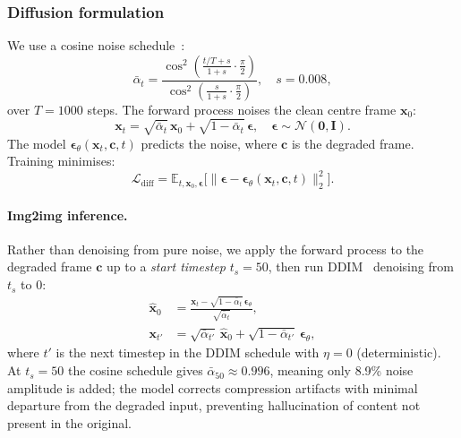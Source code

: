 \documentclass[10pt, conference]{IEEEtran}
\begin{document}
\subsubsection{Diffusion formulation}

We use a cosine noise schedule~\cite{Nichol_2021_IDDPM}:
\begin{equation}
\bar{\alpha}_t = \frac{\cos^2\!\left(\frac{t/T + s}{1+s} \cdot \frac{\pi}{2}\right)}{\cos^2\!\left(\frac{s}{1+s} \cdot \frac{\pi}{2}\right)}, \quad s = 0.008,
\end{equation}
over $T{=}1000$ steps. The forward process noises the clean centre frame $\mathbf{x}_0$:
\begin{equation}
\mathbf{x}_t = \sqrt{\bar{\alpha}_t}\,\mathbf{x}_0 + \sqrt{1{-}\bar{\alpha}_t}\,\boldsymbol{\epsilon}, \quad \boldsymbol{\epsilon} \sim \mathcal{N}(\mathbf{0}, \mathbf{I}).
\end{equation}
The model $\boldsymbol{\epsilon}_\theta(\mathbf{x}_t, \mathbf{c}, t)$ predicts the noise, where $\mathbf{c}$ is the degraded frame. Training minimises:
\begin{equation}
\mathcal{L}_{\text{diff}} = \mathbb{E}_{t,\mathbf{x}_0,\boldsymbol{\epsilon}}\bigl[\|\boldsymbol{\epsilon} - \boldsymbol{\epsilon}_\theta(\mathbf{x}_t, \mathbf{c}, t)\|_2^2\bigr].
\label{eq:diff_loss}
\end{equation}

\paragraph{Img2img inference.}
Rather than denoising from pure noise, we apply the forward process to the degraded frame $\mathbf{c}$ up to a \emph{start timestep} $t_s{=}50$, then run DDIM~\cite{Song_2021_DDIM} denoising from $t_s$ to $0$:
\begin{align}
\hat{\mathbf{x}}_0 &= \frac{\mathbf{x}_t - \sqrt{1{-}\bar{\alpha}_t}\,\boldsymbol{\epsilon}_\theta}{\sqrt{\bar{\alpha}_t}}, \label{eq:x0_pred}\\
\mathbf{x}_{t'} &= \sqrt{\bar{\alpha}_{t'}}\,\hat{\mathbf{x}}_0 + \sqrt{1{-}\bar{\alpha}_{t'}}\,\boldsymbol{\epsilon}_\theta, \label{eq:ddim_step}
\end{align}
where $t'$ is the next timestep in the DDIM schedule with $\eta{=}0$ (deterministic). At $t_s{=}50$ the cosine schedule gives $\bar{\alpha}_{50}\approx0.996$, meaning only 8.9\% noise amplitude is added; the model corrects compression artifacts with minimal departure from the degraded input, preventing hallucination of content not present in the original.
\end{document}

